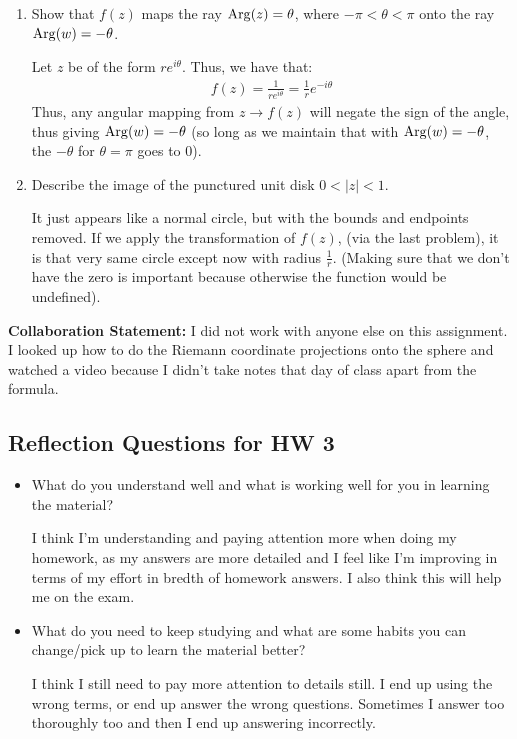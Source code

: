 \begin{enumerate}
\begin{enumerate}
\begin{problem}
		\end{problem}
		\item Show that $f(z)$ maps the ray $\operatorname{Arg}(z) = \theta$, where $-\pi < \theta < \pi$ onto the ray $\operatorname{Arg}(w) = -\theta$.
		\begin{problem}
			Let $z$ be of the form $re^{i\theta}$. Thus, we have that:
			\begin{align*}
				f(z) = \frac{1}{re^{i\theta}} = \frac{1}re^{-i\theta}
			\end{align*}
			Thus, any angular mapping from $z \to f(z)$ will negate the sign of the angle, thus giving $\operatorname{Arg}(w) =-\theta$ (so long as we maintain that with $\operatorname{Arg}(w) = -\theta$, the $-\theta$ for $\theta = \pi$ goes to 0). 
		\end{problem}
		\item Describe the image of the punctured unit disk  $0 < |z| < 1$.
		\begin{problem}
			It just appears like a normal circle, but with the bounds and endpoints removed. If we apply the transformation of $f(z)$, (via the last problem), it is that very same circle except now with radius $\frac{1}r$. (Making sure that we don't have the zero is important because otherwise the function would be undefined). 
		\end{problem}
	\end{enumerate}
\end{enumerate}
\begin{reflection}
	\textbf{Collaboration Statement:} I did not work with anyone else on this assignment. I looked up how to do the Riemann coordinate projections onto the sphere and watched a video because I didn't take notes that day of class apart from the formula. 
\end{reflection}

\subsection*{Reflection Questions for HW 3}
    \begin{itemize}
        \item What do you understand well and what is working well for you in learning the material?
		\begin{reflection}
			I think I'm understanding and paying attention more when doing my homework, as my answers are more detailed and I feel like I'm improving in terms of my effort in bredth of homework answers.\gline{}
			I also think this will help me on the exam.
		\end{reflection}
        \item What do you need to keep studying and what are some habits you can change/pick up to learn the material better?
		\begin{reflection}
			I think I still need to pay more attention to details still. I end up using the wrong terms, or end up answer the wrong questions. Sometimes I answer too thoroughly too and then I end up answering incorrectly. 
		\end{reflection}
    \end{itemize}




